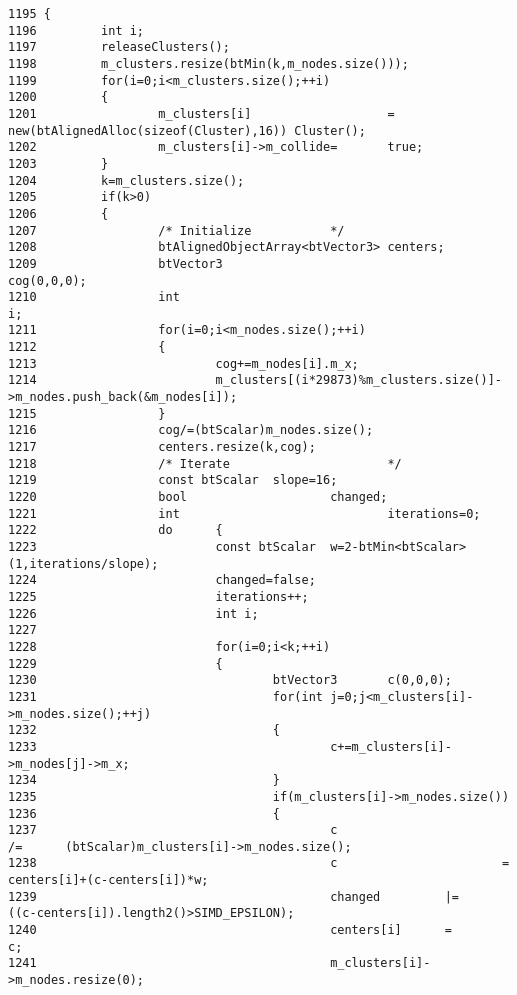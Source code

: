 \begin{Code}\begin{verbatim}1195 {
1196         int i;
1197         releaseClusters();
1198         m_clusters.resize(btMin(k,m_nodes.size()));
1199         for(i=0;i<m_clusters.size();++i)
1200         {
1201                 m_clusters[i]                   =       new(btAlignedAlloc(sizeof(Cluster),16)) Cluster();
1202                 m_clusters[i]->m_collide=       true;
1203         }
1204         k=m_clusters.size();
1205         if(k>0)
1206         {
1207                 /* Initialize           */ 
1208                 btAlignedObjectArray<btVector3> centers;
1209                 btVector3                                               cog(0,0,0);
1210                 int                                                             i;
1211                 for(i=0;i<m_nodes.size();++i)
1212                 {
1213                         cog+=m_nodes[i].m_x;
1214                         m_clusters[(i*29873)%m_clusters.size()]->m_nodes.push_back(&m_nodes[i]);
1215                 }
1216                 cog/=(btScalar)m_nodes.size();
1217                 centers.resize(k,cog);
1218                 /* Iterate                      */ 
1219                 const btScalar  slope=16;
1220                 bool                    changed;
1221                 int                             iterations=0;
1222                 do      {
1223                         const btScalar  w=2-btMin<btScalar>(1,iterations/slope);
1224                         changed=false;
1225                         iterations++;   
1226                         int i;
1227 
1228                         for(i=0;i<k;++i)
1229                         {
1230                                 btVector3       c(0,0,0);
1231                                 for(int j=0;j<m_clusters[i]->m_nodes.size();++j)
1232                                 {
1233                                         c+=m_clusters[i]->m_nodes[j]->m_x;
1234                                 }
1235                                 if(m_clusters[i]->m_nodes.size())
1236                                 {
1237                                         c                       /=      (btScalar)m_clusters[i]->m_nodes.size();
1238                                         c                       =       centers[i]+(c-centers[i])*w;
1239                                         changed         |=      ((c-centers[i]).length2()>SIMD_EPSILON);
1240                                         centers[i]      =       c;
1241                                         m_clusters[i]->m_nodes.resize(0);

\end{verbatim}
\end{Code}

